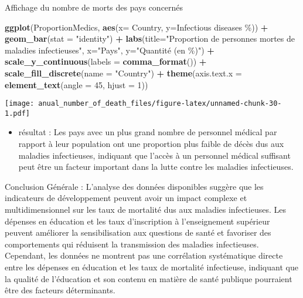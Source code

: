 \documentclass[
]{article}
\newenvironment{Shaded}{\begin{snugshade}}{\end{snugshade}}
\newcommand{\AttributeTok}[1]{\textcolor[rgb]{0.13,0.29,0.53}{#1}}
\newcommand{\DecValTok}[1]{\textcolor[rgb]{0.00,0.00,0.81}{#1}}
\newcommand{\FunctionTok}[1]{\textcolor[rgb]{0.13,0.29,0.53}{\textbf{#1}}}
\newcommand{\NormalTok}[1]{#1}
\newcommand{\SpecialCharTok}[1]{\textcolor[rgb]{0.81,0.36,0.00}{\textbf{#1}}}
\newcommand{\StringTok}[1]{\textcolor[rgb]{0.31,0.60,0.02}{#1}}
\providecommand{\tightlist}{%
  \setlength{\itemsep}{0pt}\setlength{\parskip}{0pt}}
\begin{document}
Affichage du nombre de morts des pays concernés

\begin{Shaded}
\begin{Highlighting}[]
\FunctionTok{ggplot}\NormalTok{(ProportionMedics, }\FunctionTok{aes}\NormalTok{(}\AttributeTok{x=}\NormalTok{ Country, }\AttributeTok{y=}\StringTok{\textasciigrave{}}\AttributeTok{Infectious diseases \%}\StringTok{\textasciigrave{}}\NormalTok{)) }\SpecialCharTok{+} \FunctionTok{geom\_bar}\NormalTok{(}\AttributeTok{stat =} \StringTok{"identity"}\NormalTok{) }\SpecialCharTok{+} \FunctionTok{labs}\NormalTok{(}\AttributeTok{title=}\StringTok{"Proportion de personnes mortes de maladies infectieuses"}\NormalTok{, }\AttributeTok{x=}\StringTok{"Pays"}\NormalTok{, }\AttributeTok{y=}\StringTok{"Quantité (en \%)"}\NormalTok{) }\SpecialCharTok{+} \FunctionTok{scale\_y\_continuous}\NormalTok{(}\AttributeTok{labels =} \FunctionTok{comma\_format}\NormalTok{()) }\SpecialCharTok{+} \FunctionTok{scale\_fill\_discrete}\NormalTok{(}\AttributeTok{name =} \StringTok{"Country"}\NormalTok{) }\SpecialCharTok{+} 
  \FunctionTok{theme}\NormalTok{(}\AttributeTok{axis.text.x =} \FunctionTok{element\_text}\NormalTok{(}\AttributeTok{angle =} \DecValTok{45}\NormalTok{, }\AttributeTok{hjust =} \DecValTok{1}\NormalTok{))}
\end{Highlighting}
\end{Shaded}

\texttt{[image: anual\_number\_of\_death\_files/figure-latex/unnamed-chunk-30-1.pdf]}

\begin{itemize}
\tightlist
\item
  résultat : Les pays avec un plus grand nombre de personnel médical par
  rapport à leur population ont une proportion plus faible de décès dus
  aux maladies infectieuses, indiquant que l'accès à un personnel
  médical suffisant peut être un facteur important dans la lutte contre
  les maladies infectieuses.
\end{itemize}

Conclusion Générale : L'analyse des données disponibles suggère que les
indicateurs de développement peuvent avoir un impact complexe et
multidimensionnel sur les taux de mortalité dus aux maladies
infectieuses. Les dépenses en éducation et les taux d'inscription à
l'enseignement supérieur peuvent améliorer la sensibilisation aux
questions de santé et favoriser des comportements qui réduisent la
transmission des maladies infectieuses. Cependant, les données ne
montrent pas une corrélation systématique directe entre les dépenses en
éducation et les taux de mortalité infectieuse, indiquant que la qualité
de l'éducation et son contenu en matière de santé publique pourraient
être des facteurs déterminants.
\end{document}
